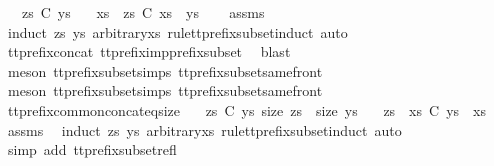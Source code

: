 \ \ \ {\isachardoublequoteopen}zs\ {\isasymlesssim}\isactrlsub C\ ys{\isachardoublequoteclose}\isanewline
\ \ \ {\isachardoublequoteopen}xs\ {\isacharat}\ zs\ {\isasymlesssim}\isactrlsub C\ xs\ {\isacharat}\ ys{\isachardoublequoteclose}\isanewline
%
\isadelimproof
\ \ %
\endisadelimproof
%
\isatagproof
{}\isamarkupfalse%
\ assms\ \isamarkupfalse%
\ {\isacharparenleft}induct\ zs\ ys\ arbitrary{\isacharcolon}xs\ rule{\isacharcolon}tt{\isacharunderscore}prefix{\isacharunderscore}subset{\isachardot}induct{\isacharcomma}\ auto{\isacharparenright}\isanewline
\ \ \isamarkupfalse%
\ tt{\isacharunderscore}prefix{\isacharunderscore}concat\ tt{\isacharunderscore}prefix{\isacharunderscore}imp{\isacharunderscore}prefix{\isacharunderscore}subset\ \isamarkupfalse%
\ blast\isanewline
\ \ \isamarkupfalse%
\ {\isacharparenleft}meson\ tt{\isacharunderscore}prefix{\isacharunderscore}subset{\isachardot}simps{\isacharparenleft}{}{\isacharparenright}\ tt{\isacharunderscore}prefix{\isacharunderscore}subset{\isacharunderscore}same{\isacharunderscore}front{\isacharparenright}\isanewline
\ \ \isamarkupfalse%
\ {\isacharparenleft}meson\ tt{\isacharunderscore}prefix{\isacharunderscore}subset{\isachardot}simps{\isacharparenleft}{}{\isacharparenright}\ tt{\isacharunderscore}prefix{\isacharunderscore}subset{\isacharunderscore}same{\isacharunderscore}front{\isacharparenright}%
\endisatagproof
{\isafoldproof}%
%
\isadelimproof
\isanewline
%
\endisadelimproof
\isanewline
{}\isamarkupfalse%
\ tt{\isacharunderscore}prefix{\isacharunderscore}common{\isacharunderscore}concat{\isacharunderscore}eq{\isacharunderscore}size{\isacharcolon}\isanewline
\ \ \ {\isachardoublequoteopen}zs\ {\isasymlesssim}\isactrlsub C\ ys{\isachardoublequoteclose}\ {\isachardoublequoteopen}size\ zs\ {\isacharequal}\ size\ ys{\isachardoublequoteclose}\isanewline
\ \ \ {\isachardoublequoteopen}zs\ {\isacharat}\ xs\ {\isasymlesssim}\isactrlsub C\ ys\ {\isacharat}\ xs{\isachardoublequoteclose}\isanewline
%
\isadelimproof
\ \ %
\endisadelimproof
%
\isatagproof
{}\isamarkupfalse%
\ assms\ \isamarkupfalse%
\ {\isacharparenleft}induct\ zs\ ys\ arbitrary{\isacharcolon}xs\ rule{\isacharcolon}tt{\isacharunderscore}prefix{\isacharunderscore}subset{\isachardot}induct{\isacharcomma}\ auto{\isacharparenright}\isanewline
\ \ \isamarkupfalse%
\ {\isacharparenleft}simp\ add{\isacharcolon}\ tt{\isacharunderscore}prefix{\isacharunderscore}subset{\isacharunderscore}refl{\isacharparenright}%
